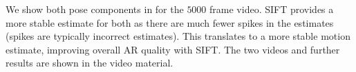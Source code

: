 We show both pose components in  for the $5000$ frame video.
SIFT provides a more stable estimate for both as there are much fewer spikes in the estimates (spikes are typically incorrect estimates).
This translates to a more stable motion estimate, improving overall AR quality with SIFT\@.
The two videos and further results are shown in the video material. 

